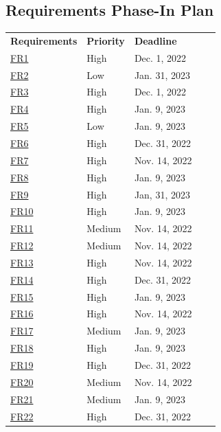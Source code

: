 \documentclass{article}
\begin{document}
\subsection{Requirements Phase-In Plan}
\begin{table}[H]
\centering
\begin{tabular}{|l|l|l|ll}
\cline{1-3}
\textbf{Requirements} & \textbf{Priority} & \textbf{Deadline} &  &  \\ \cline{1-3}
\hyperref[FR1]{FR1}          & High     & Dec. 1, 2022      &  &  \\ \cline{1-3}
\hyperref[FR2]{FR2}          & Low      & Jan. 31, 2023     &  &  \\ \cline{1-3}
\hyperref[FR3]{FR3}          & High     & Dec. 1, 2022      &  &  \\ \cline{1-3}
\hyperref[FR4]{FR4}          & High   & Jan. 9, 2023      &  &  \\ \cline{1-3}
\hyperref[FR5]{FR5}          & Low      & Jan. 9, 2023      &  &  \\ \cline{1-3}
\hyperref[FR6]{FR6}          & High     & Dec. 31, 2022     &  &  \\ \cline{1-3}
\hyperref[FR7]{FR7}          & High     & Nov. 14, 2022     &  &  \\ \cline{1-3}
\hyperref[FR8]{FR8}          & High   & Jan. 9, 2023      &  &  \\ \cline{1-3}
\hyperref[FR9]{FR9}          & High      & Jan, 31, 2023     &  &  \\ \cline{1-3}
\hyperref[FR10]{FR10}         & High      & Jan. 9, 2023      &  &  \\ \cline{1-3}
\hyperref[FR11]{FR11}         & Medium     & Nov. 14, 2022     &  &  \\ \cline{1-3}
\hyperref[FR12]{FR12}         & Medium     & Nov. 14, 2022     &  &  \\ \cline{1-3}
\hyperref[FR13]{FR13}         & High     & Nov. 14, 2022     &  &  \\ \cline{1-3}
\hyperref[FR14]{FR14}         & High     & Dec. 31, 2022     &  &  \\ \cline{1-3}
\hyperref[FR15]{FR15}         & High     & Jan. 9, 2023      &  &  \\ \cline{1-3}
\hyperref[FR16]{FR16}         & High     & Nov. 14, 2022     &  &  \\ \cline{1-3}
\hyperref[FR17]{FR17}         & Medium      & Jan. 9, 2023      &  &  \\ \cline{1-3}
\hyperref[FR18]{FR18}         & High     & Jan. 9, 2023      &  &  \\ \cline{1-3}
\hyperref[FR19]{FR19}         & High     & Dec. 31, 2022     &  &  \\ \cline{1-3}
\hyperref[FR20]{FR20}         & Medium     & Nov. 14, 2022     &  &  \\ \cline{1-3}
\hyperref[FR21]{FR21}         & Medium   & Jan. 9, 2023      &  &  \\ \cline{1-3}
\hyperref[FR22]{FR22}         & High   & Dec. 31, 2022      &  &  \\ \cline{1-3}
\end{tabular}
\end{table}
\end{document}
